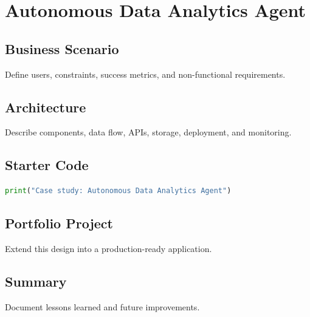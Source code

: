 \chapter{Autonomous Data Analytics Agent}
\label{chap:vol14-9}



\section{Business Scenario}
Define users, constraints, success metrics, and non-functional requirements.

\section{Architecture}
Describe components, data flow, APIs, storage, deployment, and monitoring.

\section{Starter Code}
\begin{lstlisting}[language=Python]
print("Case study: Autonomous Data Analytics Agent")
\end{lstlisting}

\section{Portfolio Project}
Extend this design into a production-ready application.

\section{Summary}
Document lessons learned and future improvements.
